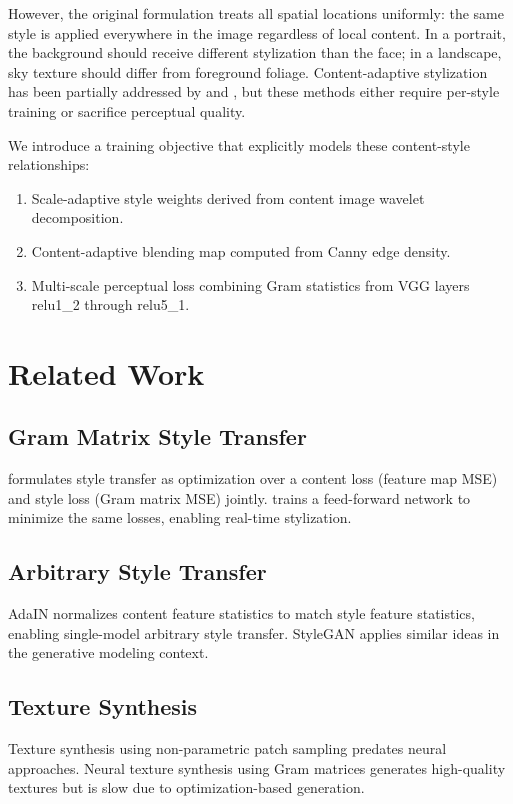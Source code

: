 \documentclass[conference]{IEEEtran}
\begin{document}
However, the original formulation treats all spatial locations uniformly: the same style is applied everywhere in the image regardless of local content. In a portrait, the background should receive different stylization than the face; in a landscape, sky texture should differ from foreground foliage. Content-adaptive stylization has been partially addressed by \cite{park2019arbitrary} and \cite{kolkin2019style}, but these methods either require per-style training or sacrifice perceptual quality.

We introduce a training objective that explicitly models these content-style relationships:
\begin{enumerate}
\item Scale-adaptive style weights derived from content image wavelet decomposition.
\item Content-adaptive blending map computed from Canny edge density.
\item Multi-scale perceptual loss combining Gram statistics from VGG layers relu1\_2 through relu5\_1.
\end{enumerate}

\section{Related Work}

\subsection{Gram Matrix Style Transfer}
\cite{gatys2016image} formulates style transfer as optimization over a content loss (feature map MSE) and style loss (Gram matrix MSE) jointly. \cite{johnson2016perceptual} trains a feed-forward network to minimize the same losses, enabling real-time stylization.

\subsection{Arbitrary Style Transfer}
AdaIN \cite{huang2017arbitrary} normalizes content feature statistics to match style feature statistics, enabling single-model arbitrary style transfer. StyleGAN \cite{karras2019style} applies similar ideas in the generative modeling context.

\subsection{Texture Synthesis}
Texture synthesis using non-parametric patch sampling \cite{efros1999texture} predates neural approaches. Neural texture synthesis \cite{gatys2015texture} using Gram matrices generates high-quality textures but is slow due to optimization-based generation.
\end{document}
